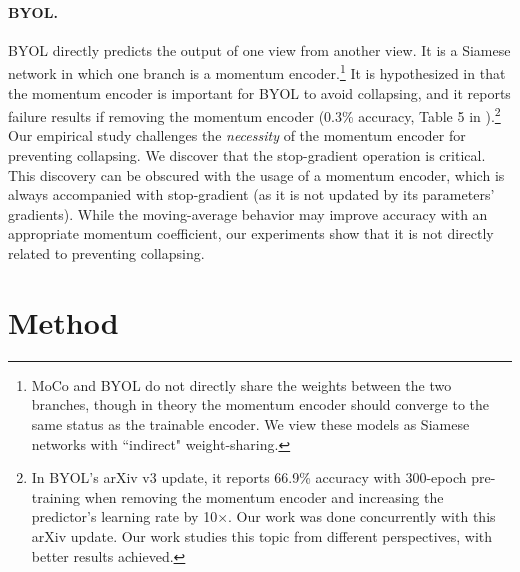 \documentclass[final]{cvpr}
\begin{document}
\paragraph{BYOL.} BYOL \cite{Grill2020} directly predicts the output of one view from another view. It is a Siamese network in which one branch is a momentum encoder.\footnote{MoCo \cite{He2019a} and BYOL \cite{Grill2020} do not directly share the weights between the two branches, though in theory the momentum encoder should converge to the same status as the trainable encoder. We view these models as Siamese networks with ``indirect" weight-sharing.}
It is hypothesized in \cite{Grill2020} that the momentum encoder is important for BYOL to avoid collapsing, and it reports failure results if removing the momentum encoder (0.3\% accuracy, Table 5 in \cite{Grill2020}).\footnote{
In BYOL's arXiv v3 update, it reports 66.9\% accuracy with 300-epoch pre-training when removing the momentum encoder and increasing the predictor's learning rate by 10$\times$.
Our work was done concurrently with this arXiv update.
Our work studies this topic from different perspectives, with better results achieved.}
Our empirical study challenges the \emph{necessity} of the momentum encoder for preventing collapsing.
We discover that the stop-gradient operation is critical. This discovery can be obscured with the usage of a momentum encoder, which is always accompanied with stop-gradient (as it is not updated by its parameters' gradients). While the moving-average behavior may improve accuracy with an appropriate momentum coefficient, our experiments show that it is not directly related to preventing collapsing.

\section{Method\label{sec:method}}
\end{document}
